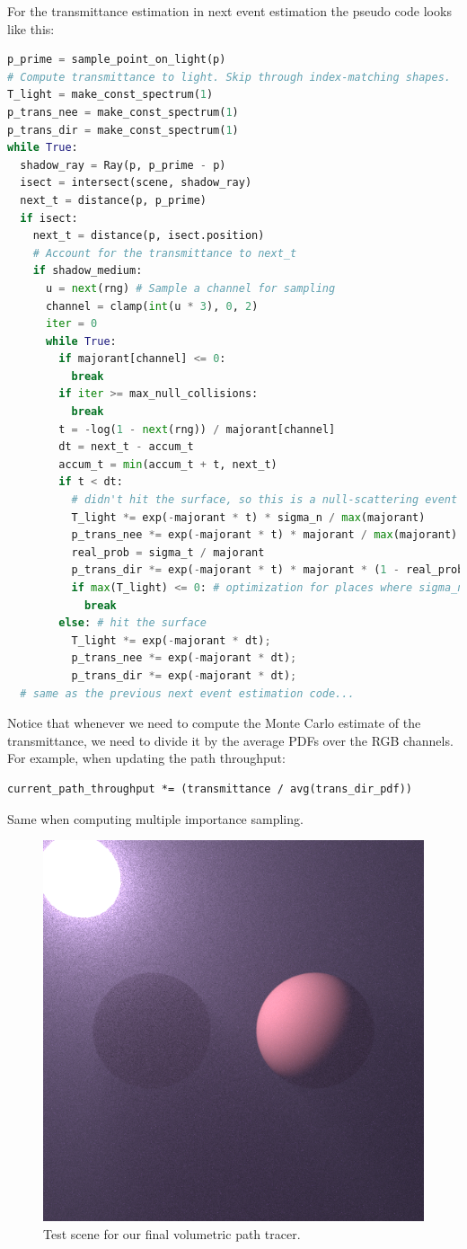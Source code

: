 For the transmittance estimation in next event estimation the pseudo code looks like this:
\begin{lstlisting}[language=python]
p_prime = sample_point_on_light(p)
# Compute transmittance to light. Skip through index-matching shapes.
T_light = make_const_spectrum(1)
p_trans_nee = make_const_spectrum(1)
p_trans_dir = make_const_spectrum(1)
while True:
  shadow_ray = Ray(p, p_prime - p)
  isect = intersect(scene, shadow_ray)
  next_t = distance(p, p_prime)
  if isect:
    next_t = distance(p, isect.position)
    # Account for the transmittance to next_t
    if shadow_medium:
      u = next(rng) # Sample a channel for sampling
      channel = clamp(int(u * 3), 0, 2)
      iter = 0
      while True:
        if majorant[channel] <= 0:
          break
        if iter >= max_null_collisions:
          break
        t = -log(1 - next(rng)) / majorant[channel]
        dt = next_t - accum_t
        accum_t = min(accum_t + t, next_t)
        if t < dt:
          # didn't hit the surface, so this is a null-scattering event
          T_light *= exp(-majorant * t) * sigma_n / max(majorant)
          p_trans_nee *= exp(-majorant * t) * majorant / max(majorant)
          real_prob = sigma_t / majorant
          p_trans_dir *= exp(-majorant * t) * majorant * (1 - real_prob) / max(majorant)
          if max(T_light) <= 0: # optimization for places where sigma_n = 0
            break
        else: # hit the surface
          T_light *= exp(-majorant * dt);
          p_trans_nee *= exp(-majorant * dt);
          p_trans_dir *= exp(-majorant * dt);
  # same as the previous next event estimation code...
\end{lstlisting}

Notice that whenever we need to compute the Monte Carlo estimate of the transmittance, we need to divide it by the
average PDFs over the RGB channels. For example, when updating the path throughput:
\begin{lstlisting}
current_path_throughput *= (transmittance / avg(trans_dir_pdf))
\end{lstlisting}
Same when computing multiple importance sampling.

\begin{figure}
\centering
\includegraphics[width=0.48\linewidth]{imgs/volpath_6.png}
\caption{Test scene for our final volumetric path tracer.}
\label{fig:volpath6}
\end{figure}

